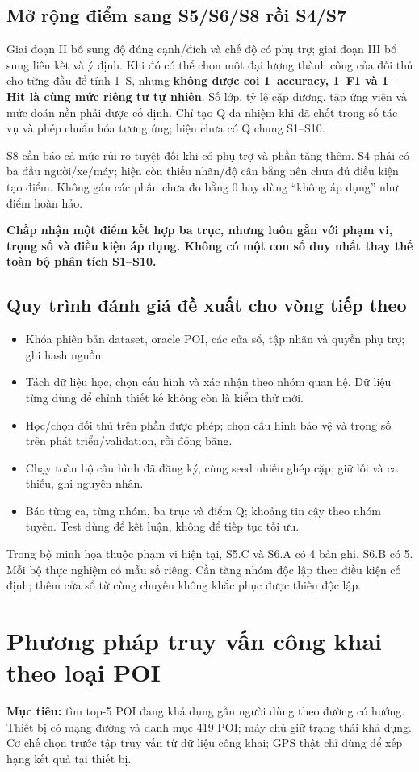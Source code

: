 \documentclass[10pt,a4paper]{article}
\newcommand{\key}[1]{\par\smallskip\noindent\colorbox{pale}{\parbox{\dimexpr\linewidth-2\fboxsep}{\textbf{#1}}}\par\smallskip}
\begin{document}
\subsection{Mở rộng điểm sang S5/S6/S8 rồi S4/S7}
Giai đoạn II bổ sung độ đúng cạnh/đích và chế độ có phụ trợ; giai đoạn III bổ sung liên kết và ý định. Khi đó có thể chọn một đại lượng thành công của đối thủ cho từng đầu để tính 1--S, nhưng \textbf{không được coi 1--accuracy, 1--F1 và 1--Hit là cùng mức riêng tư tự nhiên}. Số lớp, tỷ lệ cặp dương, tập ứng viên và mức đoán nền phải được cố định. Chỉ tạo Q đa nhiệm khi đã chốt trọng số tác vụ và phép chuẩn hóa tương ứng; hiện chưa có Q chung S1–S10.

S8 cần báo cả mức rủi ro tuyệt đối khi có phụ trợ và phần tăng thêm. S4 phải có ba đầu người/xe/máy; hiện còn thiếu nhãn/độ cân bằng nên chưa đủ điều kiện tạo điểm. Không gán các phần chưa đo bằng 0 hay dùng “không áp dụng” như điểm hoàn hảo.

\key{Chấp nhận một điểm kết hợp ba trục, nhưng luôn gắn với phạm vi, trọng số và điều kiện áp dụng. Không có một con số duy nhất thay thế toàn bộ phân tích S1–S10.}

\subsection{Quy trình đánh giá đề xuất cho vòng tiếp theo}
\begin{itemize}
\item Khóa phiên bản dataset, oracle POI, các cửa sổ, tập nhãn và quyền phụ trợ; ghi hash nguồn.
\item Tách dữ liệu học, chọn cấu hình và xác nhận theo nhóm quan hệ. Dữ liệu từng dùng để chỉnh thiết kế không còn là kiểm thử mới.
\item Học/chọn đối thủ trên phần được phép; chọn cấu hình bảo vệ và trọng số trên phát triển/validation, rồi đóng băng.
\item Chạy toàn bộ cấu hình đã đăng ký, cùng seed nhiễu ghép cặp; giữ lỗi và ca thiếu, ghi nguyên nhân.
\item Báo từng ca, từng nhóm, ba trục và điểm Q; khoảng tin cậy theo nhóm tuyến. Test dùng để kết luận, không để tiếp tục tối ưu.
\end{itemize}
Trong bộ minh họa thuộc phạm vi hiện tại, S5.C và S6.A có 4 bản ghi, S6.B có 5. Mỗi bộ thực nghiệm có mẫu số riêng. Cần tăng nhóm độc lập theo điều kiện cố định; thêm cửa sổ từ cùng chuyến không khắc phục được thiếu độc lập.


\clearpage
\section{Phương pháp truy vấn công khai theo loại POI}
\textbf{Mục tiêu:} tìm top-5 POI đang khả dụng gần người dùng theo đường có hướng. Thiết bị có mạng đường và danh mục 419 POI; máy chủ giữ trạng thái khả dụng. Cơ chế chọn trước tập truy vấn từ dữ liệu công khai; GPS thật chỉ dùng để xếp hạng kết quả tại thiết bị.
\end{document}

